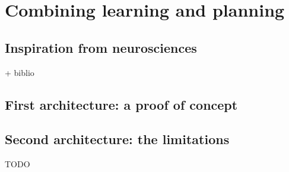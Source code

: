\documentclass[english,a4paper,11pt,twoside]{StyleThese}
\begin{document}
\setcounter{chapter}{6} %
\dominitoc
\faketableofcontents
\fi

\chapter{Combining learning and planning}
\minitoc

\section{Inspiration from neurosciences}

+ biblio

\section{First architecture: a proof of concept}

\section{Second architecture: the limitations}

TODO


\ifdefined{}
\else


\end{document}
